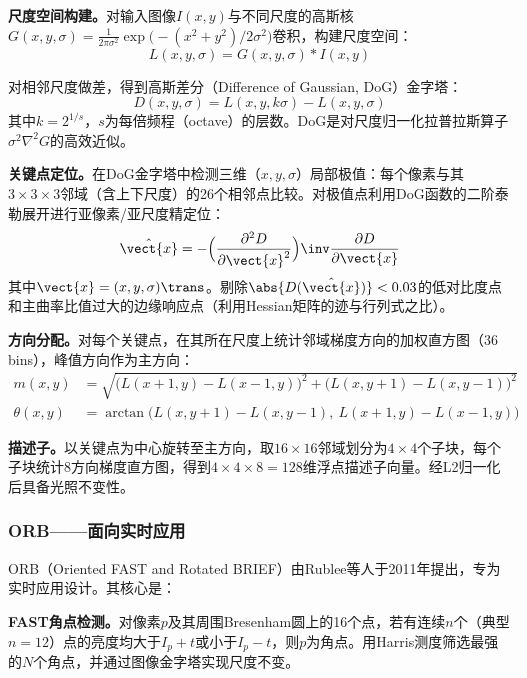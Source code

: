 \textbf{尺度空间构建。}对输入图像$I(x,y)$与不同尺度的高斯核$G(x,y,\sigma) = \frac{1}{2\pi\sigma^2}\exp\bigl(-(x^2+y^2)/2\sigma^2\bigr)$卷积，构建尺度空间：
\begin{equation}
L(x,y,\sigma) = G(x,y,\sigma) * I(x,y)
\label{eq:sift-scale}
\end{equation}

对相邻尺度做差，得到高斯差分（Difference of Gaussian, DoG）金字塔：
\begin{equation}
D(x,y,\sigma) = L(x,y,k\sigma) - L(x,y,\sigma)
\label{eq:sift-dog}
\end{equation}
其中$k = 2^{1/s}$，$s$为每倍频程（octave）的层数。DoG是对尺度归一化拉普拉斯算子$\sigma^2\nabla^2 G$的高效近似。

\textbf{关键点定位。}在DoG金字塔中检测三维（$x,y,\sigma$）局部极值：每个像素与其$3\times 3\times 3$邻域（含上下尺度）的26个相邻点比较。对极值点利用DoG函数的二阶泰勒展开进行亚像素/亚尺度精定位：
\begin{equation}
\hat{\vect{x}} = -\Bigl(\frac{\partial^2 D}{\partial \vect{x}^2}\Bigr)\inv\frac{\partial D}{\partial \vect{x}}
\label{eq:sift-subpixel}
\end{equation}
其中$\vect{x} = (x,y,\sigma)\trans$。剔除$\abs{D(\hat{\vect{x}})} < 0.03$的低对比度点和主曲率比值过大的边缘响应点（利用Hessian矩阵的迹与行列式之比）。

\textbf{方向分配。}对每个关键点，在其所在尺度上统计邻域梯度方向的加权直方图（36 bins），峰值方向作为主方向：
\begin{align}
m(x,y) &= \sqrt{\bigl(L(x+1,y)-L(x-1,y)\bigr)^2 + \bigl(L(x,y+1)-L(x,y-1)\bigr)^2} \label{eq:sift-mag} \\
\theta(x,y) &= \arctan\!\bigl(L(x,y+1)-L(x,y-1),\ L(x+1,y)-L(x-1,y)\bigr) \label{eq:sift-theta}
\end{align}

\textbf{描述子。}以关键点为中心旋转至主方向，取$16\times 16$邻域划分为$4\times 4$个子块，每个子块统计8方向梯度直方图，得到$4\times 4\times 8 = 128$维浮点描述子向量。经L2归一化后具备光照不变性。

\subsubsection{ORB——面向实时应用}

ORB（Oriented FAST and Rotated BRIEF）由Rublee等人于2011年提出，专为实时应用设计。其核心是：

\textbf{FAST角点检测。}对像素$p$及其周围Bresenham圆上的16个点，若有连续$n$个（典型$n=12$）点的亮度均大于$I_p+t$或小于$I_p-t$，则$p$为角点。用Harris测度筛选最强的$N$个角点，并通过图像金字塔实现尺度不变。

